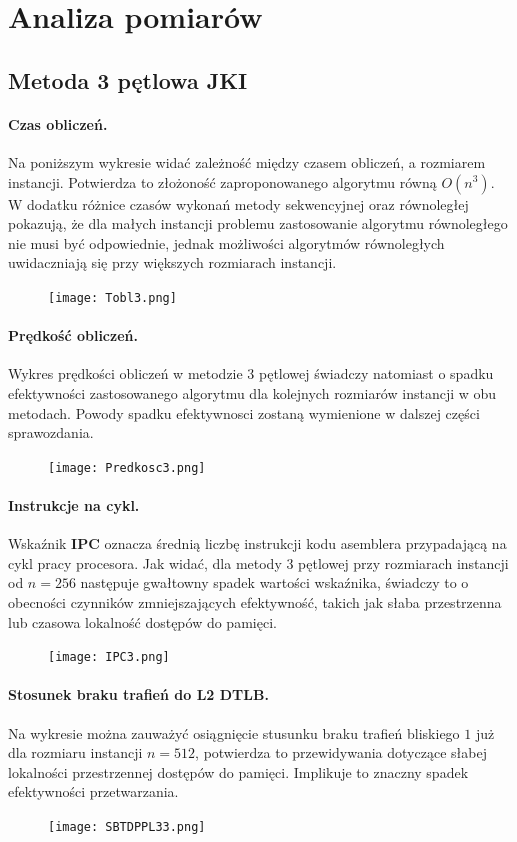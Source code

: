 \documentclass{scrartcl}
\begin{document}
\section{Analiza pomiarów}
\subsection{Metoda 3 pętlowa JKI}
\paragraph{Czas obliczeń.} Na poniższym wykresie widać zależność między czasem obliczeń, a rozmiarem instancji. Potwierdza to złożoność zaproponowanego algorytmu równą $O(n^{3})$. W dodatku różnice czasów wykonań metody sekwencyjnej oraz równoległej pokazują, że dla małych instancji problemu zastosowanie algorytmu równoległego nie musi być odpowiednie, jednak możliwości algorytmów równoległych uwidaczniają się przy większych rozmiarach instancji.
\begin{figure}[H]
\texttt{[image: Tobl3.png]}\\
\end{figure}
\paragraph{Prędkość obliczeń.} Wykres prędkości obliczeń w metodzie 3 pętlowej świadczy natomiast o spadku efektywności zastosowanego algorytmu dla kolejnych rozmiarów instancji w obu metodach. Powody spadku efektywnosci zostaną wymienione w dalszej części sprawozdania.
\begin{figure}[H]
\texttt{[image: Predkosc3.png]}\\
\end{figure}
\paragraph{Instrukcje na cykl.} Wskaźnik \textbf{IPC} oznacza średnią liczbę instrukcji kodu asemblera przypadającą na cykl pracy procesora. Jak widać, dla metody 3 pętlowej przy rozmiarach instancji od $n = 256$ następuje gwałtowny spadek wartości wskaźnika, świadczy to o obecności czynników zmniejszających efektywność, takich jak słaba przestrzenna lub czasowa lokalność dostępów do pamięci.
\begin{figure}[H]
\texttt{[image: IPC3.png]}\\
\end{figure}
\paragraph{Stosunek braku trafień do L2 DTLB.} Na wykresie można zauważyć osiągnięcie stusunku braku trafień bliskiego $1$ już dla rozmiaru instancji $n = 512$, potwierdza to przewidywania dotyczące słabej lokalności przestrzennej dostępów do pamięci. Implikuje to znaczny spadek efektywności przetwarzania.
\begin{figure}[H]
\texttt{[image: SBTDPPL33.png]}\\
\end{figure}
\end{document}
